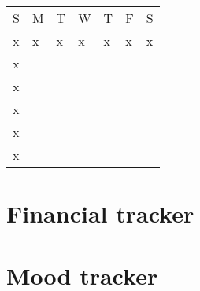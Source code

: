 \documentclass[a5paper]{article}
\begin{document}
\begin{table}[htp]
\begin{tabular}{lllllll}
\cline{1-1}
S                       & M & T & W & T & F & S \\ \cline{1-1}
x                       & x & x & x & x & x & x \\
x                       &   &   &   &   &   &   \\
x                       &   &   &   &   &   &   \\
x                       &   &   &   &   &   &   \\ \cline{1-1}
\multicolumn{1}{|l|}{x} &   &   &   &   &   &   \\ \cline{1-1}
x                       &   &   &   &   &   &   \\ \cline{1-1}
\end{tabular}
\begin{table}[htp]
\section{Financial tracker}
%
\section{Mood tracker}


\end{table}
\end{table}
\end{document}
